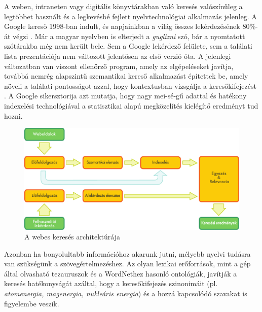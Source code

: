 \begin{multicols}{2}
  A weben, intraneten vagy digitális könyv\-tá\-rak\-ban való keresés valószínűleg a leg\-töb\-bet használt és a legkevésbé fejlett nyelv\-tech\-no\-ló\-giai alkalmazás jelenleg. A Google kereső 1998-ban indult, és napjainkban a világ összes lekérdezésének 80\%-át végzi \cite{spi1}. Már a magyar nyelvben is elterjedt a \textit{guglizni} szó, bár a nyomtatott szótárakba még nem került bele. Sem a Google lekérdező felülete, sem a találati lista prezentációja nem változott jelentősen az első verzió óta. A jelenlegi változatban van viszont ellenőrző program, amely az elgépeléseket javítja, továbbá nemrég alapszintű szemantikai kereső alkalmazást építettek be, amely növeli a találati pontosságot azzal, hogy kontextusban vizsgálja a keresőkifejezést \cite{pc1}. A Google sikersztorija azt mutatja, hogy nagy mei-sé-gű adattal és hatékony indexelési technológiával a statisztikai alapú megközelítés kielégítő eredményt tud hozni. 

  \begin{figure}[htb]
    \center
    \includegraphics[width=\textwidth]{../_media/hungarian/web_search_architecture}
    \caption{A webes keresés architektúrája}
    \label{fig:websearcharch_de}
  \end{figure}

  Azonban ha bonyolultabb információhoz akarunk jutni, mélyebb nyelvi tudásra van szükségünk a szövegértelmezéshez. Az olyan lexikai erőforrások, mint a gép által olvasható tezauruszok és a WordNethez hasonló ontológiák, javítják a keresés hatékonyságát azáltal, hogy a keresőkifejezés szinonimáit (pl. \textit{atomenergia, mag\-ener\-gia, nukleáris energia}) és a hozzá kapcsolódó szavakat is figyelembe veszik. 


\end{multicols}
